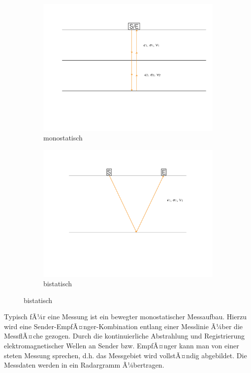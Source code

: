 \begin{figure}[H]
	\begin{subfigure}[m]{0.5\textwidth}
	\centering
		\includegraphics[scale = 0.3]{GeoradarBilder/Monostatisch}
	\caption*{monostatisch}	
	\end{subfigure}
	\begin{subfigure}[m]{0.5\textwidth}
	\centering
		\includegraphics[scale = 0.3]{GeoradarBilder/Bistatisch}
	\caption*{bistatisch}
	\end{subfigure}
\end{figure}


Typisch fÃ¼r eine Messung ist ein bewegter monostatischer Messaufbau. Hierzu wird eine Sender-EmpfÃ¤nger-Kombination entlang einer Messlinie Ã¼ber die MessflÃ¤che gezogen. Durch die kontinuierliche Abstrahlung und Registrierung elektromagnetischer Wellen an Sender bzw. EmpfÃ¤nger kann man von einer steten Messung sprechen, d.h. das Messgebiet wird vollstÃ¤ndig abgebildet. Die Messdaten werden in ein Radargramm Ã¼bertragen.

